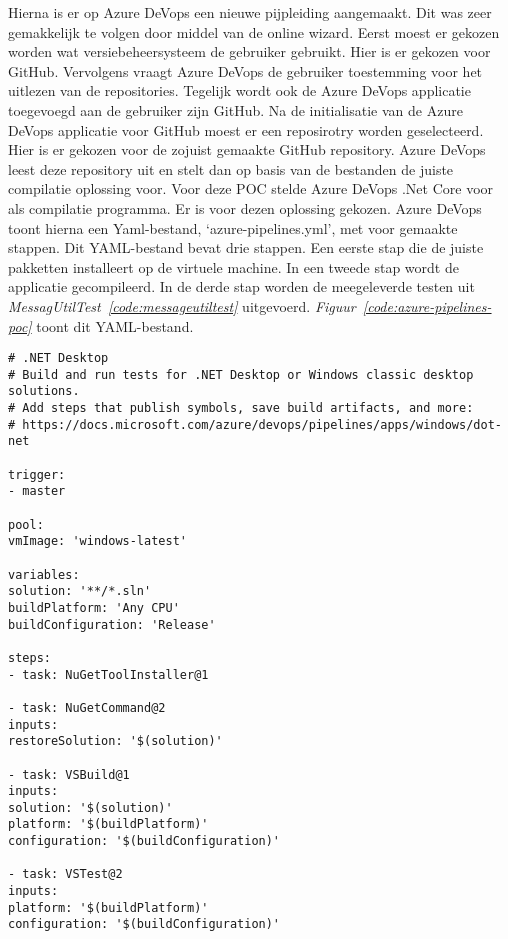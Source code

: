 Hierna is er op Azure DeVops een nieuwe pijpleiding aangemaakt. Dit was zeer gemakkelijk te volgen door middel van de online wizard. Eerst moest er gekozen worden wat versiebeheersysteem de gebruiker gebruikt. Hier is er gekozen voor GitHub. Vervolgens vraagt Azure DeVops de gebruiker toestemming voor het uitlezen van de repositories. Tegelijk wordt ook de Azure DeVops applicatie toegevoegd aan de gebruiker zijn GitHub. Na de initialisatie van de Azure DeVops applicatie voor GitHub moest er een reposirotry worden geselecteerd. Hier is er gekozen voor de zojuist gemaakte GitHub repository. Azure DeVops leest deze repository uit en stelt dan op basis van de bestanden de juiste compilatie oplossing voor. Voor deze POC stelde Azure DeVops .Net Core voor als compilatie programma. Er is voor dezen oplossing gekozen. Azure DeVops toont hierna een Yaml-bestand, ‘azure-pipelines.yml’, met voor gemaakte stappen. Dit YAML-bestand bevat drie stappen. Een eerste stap die de juiste pakketten installeert op de virtuele machine. In een tweede stap wordt de applicatie gecompileerd. In de derde stap worden de meegeleverde testen uit \emph{MessagUtilTest~\ref{code:messageutiltest}} uitgevoerd. \emph{Figuur~\ref{code:azure-pipelines-poc}} toont dit YAML-bestand.

\begin{lstlisting}
# .NET Desktop
# Build and run tests for .NET Desktop or Windows classic desktop solutions.
# Add steps that publish symbols, save build artifacts, and more:
# https://docs.microsoft.com/azure/devops/pipelines/apps/windows/dot-net

trigger:
- master

pool:
vmImage: 'windows-latest'

variables:
solution: '**/*.sln'
buildPlatform: 'Any CPU'
buildConfiguration: 'Release'

steps:
- task: NuGetToolInstaller@1

- task: NuGetCommand@2
inputs:
restoreSolution: '$(solution)'

- task: VSBuild@1
inputs:
solution: '$(solution)'
platform: '$(buildPlatform)'
configuration: '$(buildConfiguration)'

- task: VSTest@2
inputs:
platform: '$(buildPlatform)'
configuration: '$(buildConfiguration)'
\end{lstlisting}

